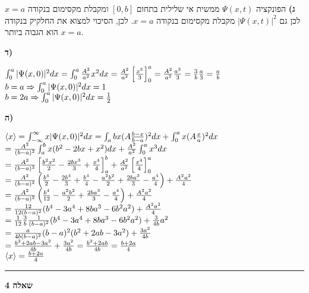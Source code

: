 \documentclass[14pt]{extarticle}
\makeatletter
\newenvironment{lefteqs}{%
    \begin{english}%
    \begin{flushleft}%
    \renewcommand{\arraystretch}{1.3}%
    $\begin{array}{@{}l@{}}%
}{%
    \end{array}$%
    \end{flushleft}%
    \end{english}%
}
\makeatother
\begin{document}
\textbf{ג)}
הפונקציה $\Psi(x,t)$ ממשית אי  שלילית בתחום $[0,b]$ ומקבלת מקסימום בנקודה $x=a$ לכן גם $|\Psi(x,t)|^2$ מקבלת מקסימום בנקודה $x=a$. לכן, הסיכוי למצוא את החלקיק בנקודה $x=a$ הוא הגבוה ביותר.

\textbf{ד)}
\begin{lefteqs}
    \int_{0}^{a} |\Psi(x,0)|^2 dx = \int_{0}^{a} \frac{A^2}{a^2} x^2 dx = \frac{A^2}{a^2} \left[ \frac{x^3}{3} \right]_{0}^{a}
    = \frac{A^2}{a^2}\frac{a^3}{3} = \frac{3}{b} \frac{a}{3} = \frac{a}{b} \\
    b = a \Rightarrow \int_{0}^{a} |\Psi(x,0)|^2 dx = 1 \\
    b = 2a \Rightarrow \int_{0}^{a} |\Psi(x,0)|^2 dx = \frac{1}{2}
\end{lefteqs}

\textbf{ה)}
\begin{lefteqs}
    \langle x \rangle = \int_{-\infty}^{\infty} x |\Psi(x,0)|^2 dx = \int_{a}{b} x(A\frac{b-x}{b-a})^2 dx + \int_{0}^{a} x(A\frac{x}{a})^2 dx \\
    = \frac{A^2}{(b-a)^2}  \int_{a}^{b}  x(b^2-2bx+x^2) dx + \frac{A^2}{a^2} \int_{0}^{a} x^3 dx \\
    = \frac{A^2}{(b-a)^2} \left[ \frac{b^2x^2}{2} - \frac{2bx^3}{3} + \frac{x^4}{4} \right]_{a}^{b} + \frac{A^2}{a^2} \left[ \frac{x^4}{4} \right]_{0}^{a} \\
    = \frac{A^2}{(b-a)^2} \left( \frac{b^4}{2} - \frac{2b^4}{3} + \frac{b^4}{4} - \frac{a^2 b^2}{2} + \frac{2ba^3}{3} - \frac{a^4}{4} \right) + \frac{A^2 a^2}{4} \\
    = \frac{A^2}{(b-a)^2} \left( \frac{b^4}{12} - \frac{a^2 b^2}{2} + \frac{2ba^3}{3} - \frac{a^4}{4} \right) + \frac{A^2 a^2}{4} \\
    = \frac{12}{12(b-a)^2} (b^4  -3a^4  +8ba^3 -6b^2a^2) + \frac{A^2a^2}{4} \\
    = \frac{1}{12} \frac{3}{b} \frac{1}{(b-a)^2} (b^4  -3a^4  +8ba^3 -6b^2a^2) + \frac{3}{4b} a^2 \\
    = \frac{a}{4b(b-a)^2}(b-a)^2(b^2+2ab-3a^2) + \frac{3a^2}{4b} \\
    = \frac{b^2+2ab-3a^2}{4b}+\frac{3a^2}{4b} = \frac{b^2+2ab}{4b}  =\frac{b+2a}{4} \\
    \langle x \rangle =  \frac{b+2a}{4}
\end{lefteqs}


\vspace{3em}
\hrule
\vspace{2em}

\textbf{\large שאלה 4}
\end{document}
